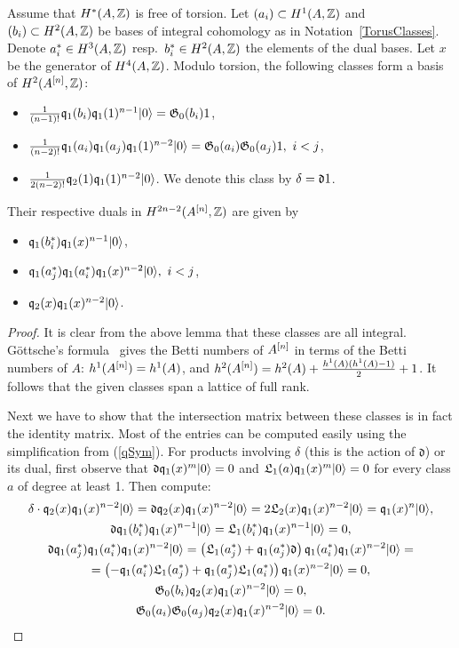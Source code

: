 \begin{proposition} Assume that $H^*(A,\mathbb{Z})$ is free of torsion.
Let $(a_i) \subset H^1(A,\mathbb{Z})$ and $(b_i)\subset H^2(A,\mathbb{Z})$ be bases of integral cohomology as in Notation~\ref{TorusClasses}. Denote $a_i^*\in H^3(A,\mathbb{Z})$ resp.~$b_i^*\in H^2(A,\mathbb{Z})$ the elements of the dual bases. Let $x$ be the generator of $H^4(A,\mathbb{Z})$. Modulo torsion, the following classes form a basis of $H^2(A^{[n]},\mathbb{Z})$:
\begin{itemize}
 \item $\frac{1}{(n-1)!}\mathfrak{q}_{1}(b_{i})\mathfrak{q}_{1}(1)^{n-1}|0\rangle = \mathfrak{G}_0(b_i) 1$,
 \item $ \frac{1}{(n-2)!}\mathfrak{q}_{1}(a_{i})\mathfrak{q}_{1}(a_{j})\mathfrak{q}_{1}(1)^{n-2}|0\rangle = \mathfrak{G}_0(a_i) \mathfrak{G}_0(a_j)1,\  i < j$, 
 \item $ \frac{1}{2(n-2)!}\mathfrak{q}_{2}(1) \mathfrak{q}_{1}(1)^{n-2}|0\rangle$. We denote this class by $\delta = \mathfrak{d} 1$.
\end{itemize}
Their respective duals in $H^{2n-2}(A^{[n]},\mathbb{Z})$ are given by
\begin{itemize}
 \item $\mathfrak{q}_{1}(b_{i}^*)\mathfrak{q}_{1}(x)^{n-1}|0\rangle$,
 \item $\mathfrak{q}_{1}(a_{j}^*)\mathfrak{q}_{1}(a_{i}^*)\mathfrak{q}_{1}(x)^{n-2}|0\rangle,\  i < j$,
 \item $\mathfrak{q}_2(x)\mathfrak{q}_{1}(x)^{n-2} |0\rangle$.
\end{itemize}
\end{proposition}
\begin{proof} It is clear from the above lemma that these classes are all integral.
G\"ottsche's formula~\cite[p.~35]{Gottsche} gives the Betti numbers of $A^{[n]}$ in terms of the Betti numbers of $A$: 
$h^1(A^{[n]}) = h^1(A)$, and $h^2(A^{[n]}) = h^2(A)+ \frac{h^1(A)(h^1(A)-1)}{2} + 1$. It follows that the given classes span a lattice of full rank.

Next we have to show that the intersection matrix between these classes is in fact the identity matrix. Most of the entries can be computed easily using the simplification from (\ref{qSym}). For products involving $\delta$ (this is the action of $\mathfrak{d}$) or its dual, first observe that $\mathfrak{d}\mathfrak{q}_1(x)^m|0\rangle = 0 $ and $ \mathfrak{L}_1(a)\mathfrak{q}_1(x)^m|0\rangle =0$ for every class $a$ of degree at least 1. Then compute:
\begin{gather*}
\delta \cdot\mathfrak{q}_2(x)\mathfrak{q}_{1}(x)^{n-2} |0\rangle = \mathfrak{d}\mathfrak{q}_2(x)\mathfrak{q}_{1}(x)^{n-2} |0\rangle = 2 \mathfrak{L}_2(x) \mathfrak{q}_{1}(x)^{n-2} |0\rangle = \mathfrak{q}_{1}(x)^{n}|0\rangle,
\\
\mathfrak{d}\mathfrak{q}_{1}(b_{i}^*)\mathfrak{q}_{1}(x)^{n-1}|0\rangle =  \mathfrak{L}_1(b_i^*) \mathfrak{q}_{1}(x)^{n-1} |0\rangle = 0,
\\
\mathfrak{d}\mathfrak{q}_{1}(a_{j}^*)\mathfrak{q}_{1}(a_{i}^*)\mathfrak{q}_{1}(x)^{n-2}|0\rangle = \left(\mathfrak{L}_1(a_j^*) +\mathfrak{q}_{1}(a_{j}^*)\mathfrak{d}\right)\mathfrak{q}_{1}(a_{i}^*)\mathfrak{q}_{1}(x)^{n-2}|0\rangle = 
  \\ =\left(-\mathfrak{q}_1(a_i^*)\mathfrak{L}_1(a_j^*) + \mathfrak{q}_{1}(a_{j}^*)\mathfrak{L}_1(a_i^*)\right)\mathfrak{q}_{1}(x)^{n-2}|0\rangle  = 0,
\\
\mathfrak{G}_0(b_i)\mathfrak{q}_2(x)\mathfrak{q}_{1}(x)^{n-2} |0\rangle = 0, 
\\
\mathfrak{G}_0(a_i)\mathfrak{G}_0(a_j)\mathfrak{q}_2(x)\mathfrak{q}_{1}(x)^{n-2} |0\rangle = 0.
\qedhere
\end{gather*}
\end{proof}

